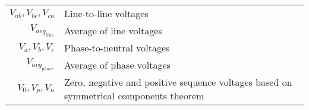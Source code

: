 \begin{scriptsize}
\begin{tabularx}{\textwidth}{r|X}
%
%
%
%
%
$V_{ab},V_{bc},V_{ca}$  					& Line-to-line voltages\\
$V_{avg_{line}}$  								& Average of line voltages\\	
$V_{a},V_{b},V_{c}$  							& Phase-to-neutral voltages\\
$V_{avg_{phase}}$  								& Average of phase voltages\\
$V_{0},V_{p},V_{n}$  							& Zero, negative and positive sequence voltages based on symmetrical components theorem\\

\end{tabularx}
\end{scriptsize}
